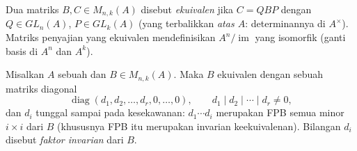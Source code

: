 \begin{definition}\label{def:b3:modules:equivalence}
Dua matriks $B, C \in M_{n,k}(A)$ disebut \emph{ekuivalen} jika $C =
QBP$ dengan $Q \in GL_n(A)$, $P \in GL_k(A)$ (yang terbalikkan
\emph{atas $A$}: determinannya di $A^\times$). Matriks penyajian
yang ekuivalen mendefinisikan  $A^n/
\operatorname{im}$ yang isomorfik (ganti basis di $A^n$ dan $A^k$).
\end{definition}

\begin{theorem}\label{thm:b3:modules:smith}
Misalkan $A$ sebuah  dan $B \in M_{n,k}(A)$. Maka $B$ ekuivalen dengan
sebuah matriks diagonal
\[
\operatorname{diag}(d_1, d_2, \dots, d_r, 0, \dots, 0),
\qquad d_1 \mid d_2 \mid \cdots \mid d_r \neq 0 ,
\]
dan $d_i$ tunggal sampai pada kesekawanan: $d_1 \cdots d_i$ merupakan
FPB semua minor $i \times i$ dari $B$ (khususnya FPB itu
merupakan invarian keekuivalenan). Bilangan $d_i$ disebut \emph{faktor
invarian} dari $B$.
\end{theorem}

